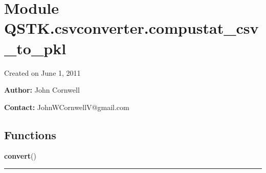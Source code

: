 %
%
%


\section{Module QSTK.csvconverter.compustat\_csv\_to\_pkl}

    \label{QSTK:csvconverter:compustat_csv_to_pkl}
Created on June 1, 2011

\textbf{Author:} John Cornwell



\textbf{Contact:} JohnWCornwellV@gmail.com





  \subsection{Functions}

    \label{QSTK:csvconverter:compustat_csv_to_pkl:convert}

    \vspace{0.5ex}

\hspace{.8\funcindent}\begin{boxedminipage}{\funcwidth}

    \raggedright \textbf{convert}()

    \vspace{-1.5ex}

    \rule{\textwidth}{0.5\fboxrule}
\setlength{\parskip}{2ex}
\setlength{\parskip}{1ex}
    \end{boxedminipage}


